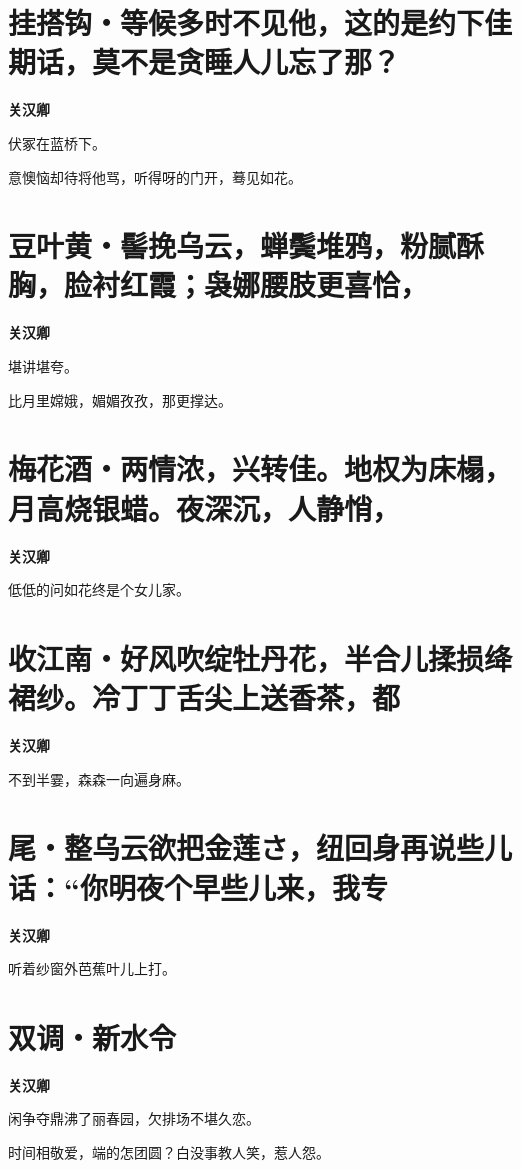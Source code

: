 \documentclass[12pt,a4paper]{ctexbook}
\begin{document}
\section{挂搭钩・等候多时不见他，这的是约下佳期话，莫不是贪睡人儿忘了那？}
\textbf{关汉卿}\par\vspace{0.5em}
伏冢在蓝桥下。\par
意懊恼却待将他骂，听得呀的门开，蓦见如花。\par

\section{豆叶黄・髻挽乌云，蝉鬓堆鸦，粉腻酥胸，脸衬红霞；袅娜腰肢更喜恰，}
\textbf{关汉卿}\par\vspace{0.5em}
堪讲堪夸。\par
比月里嫦娥，媚媚孜孜，那更撑达。\par

\section{梅花酒・两情浓，兴转佳。地权为床榻，月高烧银蜡。夜深沉，人静悄，}
\textbf{关汉卿}\par\vspace{0.5em}
低低的问如花终是个女儿家。\par

\section{收江南・好风吹绽牡丹花，半合儿揉损绛裙纱。冷丁丁舌尖上送香茶，都}
\textbf{关汉卿}\par\vspace{0.5em}
不到半霎，森森一向遍身麻。\par

\section{尾・整乌云欲把金莲さ，纽回身再说些儿话：“你明夜个早些儿来，我专}
\textbf{关汉卿}\par\vspace{0.5em}
听着纱窗外芭蕉叶儿上打。\par

\section{双调・新水令}
\textbf{关汉卿}\par\vspace{0.5em}
闲争夺鼎沸了丽春园，欠排场不堪久恋。\par
时间相敬爱，端的怎团圆？白没事教人笑，惹人怨。\par
\end{document}
